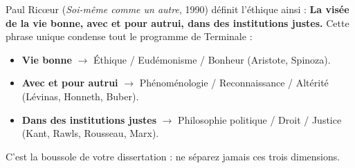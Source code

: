 \documentclass[11pt]{article}
\begin{document}
\begin{savaistu}
Paul Ricœur (\emph{Soi-même comme un autre}, 1990) définit l'éthique ainsi : \og \textbf{La visée de la vie bonne, avec et pour autrui, dans des institutions justes.} \fg
Cette phrase unique condense tout le programme de Terminale :
\begin{itemize}
    \item \textbf{Vie bonne} $\rightarrow$ Éthique / Eudémonisme / Bonheur (Aristote, Spinoza).
    \item \textbf{Avec et pour autrui} $\rightarrow$ Phénoménologie / Reconnaissance / Altérité (Lévinas, Honneth, Buber).
    \item \textbf{Dans des institutions justes} $\rightarrow$ Philosophie politique / Droit / Justice (Kant, Rawls, Rousseau, Marx).
\end{itemize}
C'est la boussole de votre dissertation : ne séparez jamais ces trois dimensions.
\end{savaistu}
\end{document}
